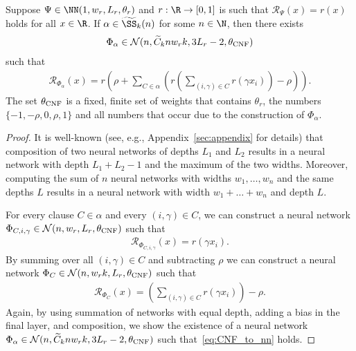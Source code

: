 \documentclass{amsart}[11pt]
\numberwithin{equation}{section}
\newcommand{\nn}{\mathcal{N}}
\newcommand{\realization}{\mathcal{R}}
\numberwithin{theorem}{section}
\begin{document}
\begin{lemma}\label{lem:CNF_to_nn}
    Suppose $\Psi \in \NN(1, w_r, L_r, \theta_r)$ and $r: \R \to [0, 1]$ is such that $\realization_\Psi(x) = r(x)$ holds for all $x \in \R$. If $\alpha \in \widetilde \SS_k(n)$ for some $n \in \N$, then there exists 
    \begin{align*}
        \Phi_\alpha \in \nn(n, \widetilde C_k n w_r k, 3L_r - 2, \theta_{\rm{CNF}})
    \end{align*}
    such that 
    \begin{align}\label{eq:CNF_to_nn}
        \realization_{\Phi_\alpha}(x) = r\left(\rho + \sum_{C \in \alpha} \left(r\left(\sum_{(i, \gamma) \in C} r\left(\gamma x_i\right)\right) - \rho\right)\right).
    \end{align}
    The set $\theta_{\rm{CNF}}$ is a fixed, finite set of weights that contains $\theta_r$, the numbers $\{-1 ,-\rho, 0, \rho,1\}$ and all numbers that occur due to the construction of $\Phi_\alpha$.
\end{lemma}
\begin{proof}
    It is well-known (see, e.g., Appendix~\ref{sec:appendix} for details) that composition of two neural networks of depths $L_1$ and $L_2$ results in a neural network with depth $L_1+L_2-1$ and the maximum of the two widths. Moreover, computing the sum of $n$ neural networks with widths $w_1,\ldots,w_n$ and the same depths $L$ results in a neural network with width $w_1+\ldots+w_n$ and depth $L$.

    For every clause $C\in \alpha$ and every $(i, \gamma) \in C$, we can construct a neural network $\Phi_{C,i,\gamma} \in \nn(n, w_r, L_r, \theta_{\rm{CNF}})$ such that
    \begin{align*}
        \realization_{\Phi_{C,i,\gamma}}(x) = r(\gamma x_i).
    \end{align*}
    By summing over all $(i, \gamma) \in C$ and subtracting $\rho$ we can construct a neural network $\Phi_C \in \nn(n, w_rk, L_r, \theta_{\rm{CNF}})$ such that
    \begin{align*}
        \realization_{\Phi_C}(x) = \left(\sum_{(i, \gamma) \in C} r(\gamma x_i)\right) - \rho.
    \end{align*}
    Again, by using summation of networks with equal depth, adding a bias in the final layer, and composition, we show the existence of a neural network $\Phi_\alpha \in \nn(n, \widetilde C_k n w_r k, 3L_r - 2, \theta_{\rm{CNF}})$ such that~\eqref{eq:CNF_to_nn} holds. 
\end{proof}
\end{document}
